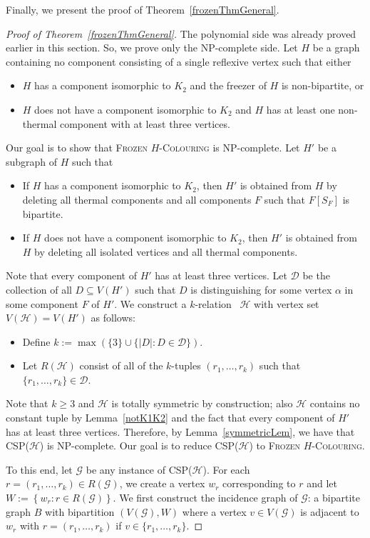 \documentclass[11 pt]{amsart}
\theoremstyle{definition}
\theoremstyle{case}
\numberwithin{equation}{section}
\newcommand\Hfrz[1]{\textsc{Frozen $#1$-Colouring}}
\newcommand\CSP[1]{\textsc{CSP($#1$)}}
\newcommand{\kgraph}{$k$-relation}
\begin{document}
Finally, we present the proof of Theorem~\ref{frozenThmGeneral}.

\begin{proof}[Proof of Theorem~\ref{frozenThmGeneral}]
The polynomial side was already proved earlier in this section. So, we prove only the NP-complete side. Let $H$ be a graph containing no component consisting of a single reflexive vertex such that either 
\begin{itemize}
\item $H$ has a component isomorphic to $K_2$ and the freezer of $H$ is non-bipartite, or
\item $H$ does not have a component isomorphic to $K_2$ and $H$ has at least one non-thermal component with at least three vertices. 
\end{itemize}
Our goal is to show that \Hfrz{H} is NP-complete. Let $H'$ be a subgraph of $H$ such that
\begin{itemize}
\item If $H$ has a component isomorphic to $K_2$, then $H'$ is obtained from $H$ by deleting all thermal components and all components $F$ such that $F[S_F]$ is bipartite.
\item If $H$ does not have a component isomorphic to $K_2$, then $H'$ is obtained from $H$ by deleting all isolated vertices and all thermal components. 
\end{itemize}


Note that every component of $H'$ has at least three vertices. Let $\mathcal{D}$ be the collection of all $D\subseteq V(H')$ such that $D$ is distinguishing for some vertex $\alpha$ in some component $F$ of $H'$. We construct a \kgraph~ $\mathcal{H}$ with vertex set $V(\mathcal{H})=V(H')$ as follows:
\begin{itemize}
\item Define $k:=\max\left(\{3\}\cup \{|D|: D\in\mathcal{D}\}\right)$. 
\item Let $R(\mathcal{H})$ consist of all of the $k$-tuples $(r_1,\dots,r_k)$ such that $\{r_1,\dots,r_k\}\in \mathcal{D}$. 
\end{itemize}
Note that $k \geq 3$ and $\mathcal{H}$ is totally symmetric by construction; also $\mathcal{H}$ contains no constant tuple by Lemma~\ref{notK1K2} and the fact that every component of $H'$ has at least three vertices. Therefore, by Lemma~\ref{symmetricLem}, we have that \CSP{\mathcal{H}} is NP-complete. Our goal is to reduce \CSP{\mathcal{H}} to \Hfrz{H}. 

To this end, let $\mathcal{G}$ be any instance of \CSP{\mathcal{H}}. For each $r=(r_1,\dots,r_k)\in R(\mathcal{G})$, we create a vertex $w_r$ corresponding to $r$ and let $W:=\left\{w_r: r\in R(\mathcal{G})\right\}$. We first construct the incidence graph of $\mathcal{G}$: a bipartite graph $B$ with bipartition $\left(V(\mathcal{G}),W\right)$ where a vertex $v\in V(\mathcal{G})$ is adjacent to $w_r$ with $r=(r_1,\dots,r_k)$ if $v\in \{r_1,\dots,r_k\}$. 


\end{proof}
\end{document}
